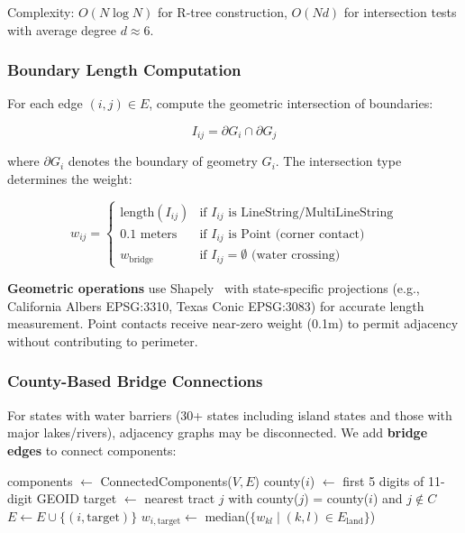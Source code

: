 Complexity: $O(N \log N)$ for R-tree construction, $O(Nd)$ for intersection tests with average degree $d \approx 6$.

\subsubsection{Boundary Length Computation}

For each edge $(i,j) \in E$, compute the geometric intersection of boundaries:

\begin{equation}
    I_{ij} = \partial G_i \cap \partial G_j
\end{equation}

where $\partial G_i$ denotes the boundary of geometry $G_i$. The intersection type determines the weight:

\begin{equation}
    w_{ij} = \begin{cases}
        \text{length}(I_{ij}) & \text{if } I_{ij} \text{ is LineString/MultiLineString} \\
        0.1 \text{ meters} & \text{if } I_{ij} \text{ is Point (corner contact)} \\
        w_{\text{bridge}} & \text{if } I_{ij} = \emptyset \text{ (water crossing)}
    \end{cases}
\end{equation}

\textbf{Geometric operations} use Shapely~\cite{shapely} with state-specific projections (e.g., California Albers EPSG:3310, Texas Conic EPSG:3083) for accurate length measurement. Point contacts receive near-zero weight (0.1m) to permit adjacency without contributing to perimeter.

\subsubsection{County-Based Bridge Connections}

For states with water barriers (30+ states including island states and those with major lakes/rivers), adjacency graphs may be disconnected. We add \textbf{bridge edges} to connect components:

\begin{algorithmic}[1]
    \State components $\gets$ ConnectedComponents($V, E$)
            \State county($i$) $\gets$ first 5 digits of 11-digit GEOID
            \State target $\gets$ nearest tract $j$ with county($j$) = county($i$) and $j \notin C$
                \State $E \gets E \cup \{(i, \text{target})\}$
                \State $w_{i,\text{target}} \gets$ median($\{w_{kl} \mid (k,l) \in E_{\text{land}}\}$)
            \EndIf
        \EndFor
    \EndFor
\EndFunction
\end{algorithmic}

